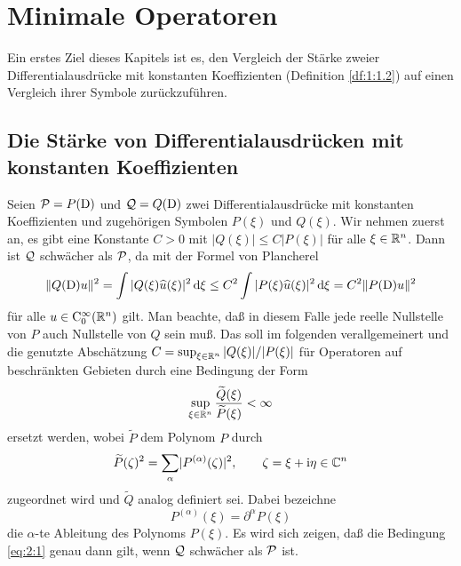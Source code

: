 \chapter{Minimale Operatoren}\label{chap2}

Ein erstes Ziel dieses Kapitels ist es, den Vergleich der Stärke
zweier Differentialausdrücke mit konstanten Koeffizienten  (Definition \ref{df:1:1.2})  auf einen Vergleich ihrer Symbole zurückzuführen. 

\section{Die Stärke von Differentialausdrücken mit konstanten Koeffizienten}

Seien $\mathcal P=P(\mathrm D)$ und $\mathcal Q=Q(\mathrm D)$ zwei Differentialausdrücke mit konstanten Koeffizienten und zugehörigen Symbolen $P(\xi)$ und $Q(\xi)$. Wir nehmen zuerst an, es gibt eine Konstante $C>0$ mit $|Q(\xi)|\le C|P(\xi)|$ für alle $\xi\in\mathbb R^n$. Dann ist $\mathcal Q$ schwächer als $\mathcal P$, da mit der Formel von Plancherel 
\begin{equation}
    \|Q(\mathrm D) u\|^2 = \int |Q(\xi)\widehat u(\xi)|^2 \,\mathrm d\xi \le C^2 \int |P(\xi)\widehat u(\xi)|^2 \,\mathrm d\xi = C^2 \|P(\mathrm D)u \|^2 
\end{equation}
für alle $u\in\mathrm C_0^\infty(\mathbb R^n)$ gilt. Man beachte, daß in diesem Falle jede reelle Nullstelle von $P$ auch Nullstelle von $Q$ sein muß. Das soll im folgenden verallgemeinert und die genutzte Abschätzung $C=\sup_{\xi\in\mathbb R^n} |Q(\xi)|/|P(\xi)|$ für Operatoren auf beschränkten Gebieten  durch eine Bedingung der Form
\begin{equation}\label{eq:2:1}
\sup_{\xi\in\mathbb R^n}\frac{\widetilde{Q}(\xi)}{\widetilde{P}(\xi)}<\infty
\end{equation}
ersetzt werden, wobei $\widetilde{P}$ dem Polynom $P$ durch
\begin{equation}\label{eq:2:2}
\widetilde{P}(\zeta)^2=\sum_\alpha\lvert P^{(\alpha)}(\zeta)\rvert^2,\qquad \zeta=\xi+\mathrm i\eta \in\mathbb C^n
\end{equation}
zugeordnet wird und $\widetilde Q$ analog definiert sei. Dabei bezeichne 
\begin{equation}
P^{(\alpha)}(\xi)=\partial^\alpha P(\xi)
\end{equation}
die $\alpha$-te Ableitung des Polynoms $P(\xi)$. Es wird sich zeigen, daß die Bedingung \eqref{eq:2:1} genau dann gilt, wenn $\mathcal Q$ schwächer als $\mathcal P$ ist.

